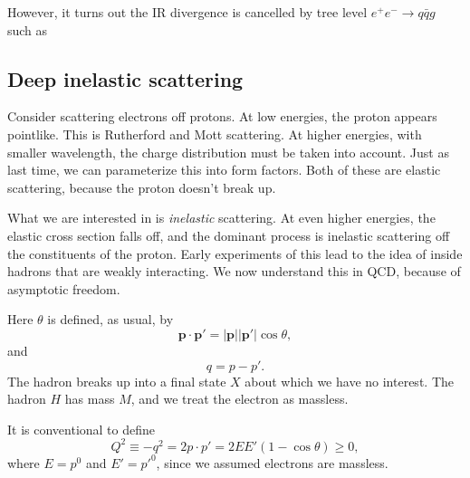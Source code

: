 \documentclass[a4paper]{article}
\begin{document}
However, it turns out the IR divergence is cancelled by tree level $e^+ e^- \to q\bar{q} g$ such as
\begin{center}
\end{center}
\subsection{Deep inelastic scattering}
Consider scattering electrons off protons. At low energies, the proton appears pointlike. This is Rutherford and Mott scattering. At higher energies, with smaller wavelength, the charge distribution must be taken into account. Just as last time, we can parameterize this into form factors. Both of these are elastic scattering, because the proton doesn't break up.

What we are interested in is \emph{inelastic} scattering. At even higher energies, the elastic cross section falls off, and the dominant process is inelastic scattering off the constituents of the proton. Early experiments of this lead to the idea of  inside hadrons that are weakly interacting. We now understand this in QCD, because of asymptotic freedom.


Here $\theta$ is defined, as usual, by
\[
  \mathbf{p}\cdot \mathbf{p}' = |\mathbf{p}||\mathbf{p}'| \cos \theta,
\]
and
\[
  q = p - p'.
\]
The hadron breaks up into a final state $X$ about which we have no interest. The hadron $H$ has mass $M$, and we treat the electron as massless.

It is conventional to define
\[
  Q^2 \equiv - q^2 = 2 p \cdot p' = 2 E E' (1 - \cos \theta) \geq 0,
\]
where $E = p^0$ and $E' = p'^0$, since we assumed electrons are massless.
\end{document}
